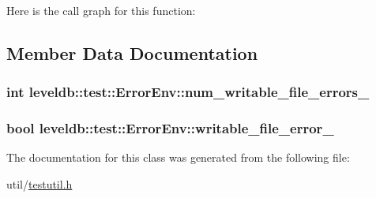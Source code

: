 Here is the call graph for this function\-:




\subsection{Member Data Documentation}
\hypertarget{classleveldb_1_1test_1_1_error_env_afa4564355d86107c8ed0d6efe53eadef}{
\subsubsection[{num\-\_\-writable\-\_\-file\-\_\-errors\-\_\-}]{\setlength{\rightskip}{0pt plus 5cm}int leveldb\-::test\-::\-Error\-Env\-::num\-\_\-writable\-\_\-file\-\_\-errors\-\_\-}}\label{classleveldb_1_1test_1_1_error_env_afa4564355d86107c8ed0d6efe53eadef}
\hypertarget{classleveldb_1_1test_1_1_error_env_ae3593b752dff671f24f3637376e1cf22}{
\subsubsection[{writable\-\_\-file\-\_\-error\-\_\-}]{\setlength{\rightskip}{0pt plus 5cm}bool leveldb\-::test\-::\-Error\-Env\-::writable\-\_\-file\-\_\-error\-\_\-}}\label{classleveldb_1_1test_1_1_error_env_ae3593b752dff671f24f3637376e1cf22}


The documentation for this class was generated from the following file\-:\begin{DoxyCompactItemize}
\item 
util/\hyperlink{testutil_8h}{testutil.\-h}\end{DoxyCompactItemize}
